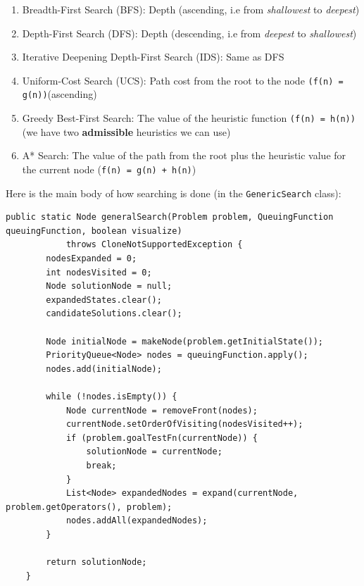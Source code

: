 \documentclass{article}
\begin{document}
\begin{enumerate}
\item Breadth-First Search (BFS): Depth (ascending, i.e from \textit{shallowest} to \textit{deepest})
\item Depth-First Search (DFS): Depth (descending, i.e from \textit{deepest} to \textit{shallowest})
\item Iterative Deepening Depth-First Search (IDS): Same as DFS
\item Uniform-Cost Search (UCS): Path cost from the root to the node \texttt{(f(n) = g(n))}(ascending)
\item Greedy Best-First Search: The value of the heuristic function \texttt{(f(n) = h(n))}(we have two \textbf{admissible} heuristics we can use)
\item A* Search: The value of the path from the root plus the heuristic value for the current node (\texttt{f(n) = g(n) + h(n)})
\end{enumerate}

\newpage

Here is the main body of how searching is done (in the \texttt{GenericSearch} class):
\begin{verbatim}
public static Node generalSearch(Problem problem, QueuingFunction queuingFunction, boolean visualize)
            throws CloneNotSupportedException {
        nodesExpanded = 0;
        int nodesVisited = 0;
        Node solutionNode = null;
        expandedStates.clear();
        candidateSolutions.clear();

        Node initialNode = makeNode(problem.getInitialState());
        PriorityQueue<Node> nodes = queuingFunction.apply();
        nodes.add(initialNode);

        while (!nodes.isEmpty()) {
            Node currentNode = removeFront(nodes);
            currentNode.setOrderOfVisiting(nodesVisited++);
            if (problem.goalTestFn(currentNode)) {
                solutionNode = currentNode;
                break;
            }
            List<Node> expandedNodes = expand(currentNode, problem.getOperators(), problem);
            nodes.addAll(expandedNodes);
        }

        return solutionNode;
    }
\end{verbatim}
\end{document}
